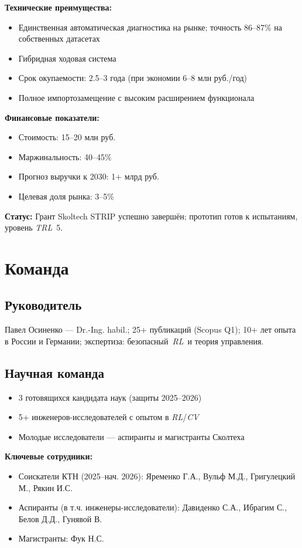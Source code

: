 \documentclass[12pt,a4paper]{article}
\begin{document}
\textbf{Технические преимущества:}
\begin{itemize}
    \item Единственная автоматическая диагностика на рынке; точность 86–87\% на собственных датасетах
    \item Гибридная ходовая система
    \item Срок окупаемости: 2.5–3 года (при экономии 6–8 млн руб./год)
    \item Полное импортозамещение с высоким расширением функционала
\end{itemize}

\textbf{Финансовые показатели:}
\begin{itemize}
    \item Стоимость: 15–20 млн руб.
    \item Маржинальность: 40–45\%
    \item Прогноз выручки к 2030: 1+ млрд руб.
    \item Целевая доля рынка: 3–5\%
\end{itemize}
\textbf{Статус:} Грант Skoltech STRIP успешно завершён; прототип готов к испытаниям, уровень \textit{TRL}~5.

\section{Команда}
\subsection*{Руководитель}
Павел Осиненко --- Dr.-Ing. habil.; 25+ публикаций (Scopus Q1); 10+ лет опыта в России и Германии; экспертиза: безопасный~\textit{RL}\ и теория управления. %

\subsection*{Научная команда}
\begin{itemize}
    \item 3 готовящихся кандидата наук (защиты 2025–2026)
    \item 5+ инженеров-исследователей с опытом в \textit{RL}/\textit{CV}
    \item Молодые исследователи --- аспиранты и магистранты Сколтеха
\end{itemize}
\textbf{Ключевые сотрудники:}
\begin{itemize}
    \item Соискатели КТН (2025–нач. 2026): Яременко Г.А., Вульф М.Д., Григулецкий М., Рякин И.С.
    \item Аспиранты (в т.ч. инженеры-исследователи): Давиденко С.А., Ибрагим С., Белов Д.Д., Гунявой В.
    \item Магистранты: Фук Н.С.
\end{itemize}
\end{document}
